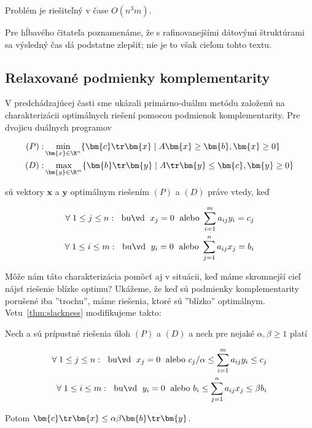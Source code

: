 \begin{veta}
  Problém \minfactor je riešiteľný v čase $O(n^3m)$.
\end{veta}

\noindent
Pre hĺbavého čitateľa poznamenáme, že s rafinovanejšími dátovými štruktúrami sa výsledný čas dá podstatne zlepšiť;
nie je to však cieľom tohto textu.



\subsection*{Relaxované podmienky komplementarity}


\noindent
V predchádzajúcej časti sme ukázali primárno-duálnu metódu založenú na charakterizácii
optimálnych riešení pomocou podmienok komplementarity. Pre dvojicu duálnych programov

\begin{eqnarray*}
  (P):&\min\limits_{\bm{x}\in\R^n}\{\bm{c}\tr\bm{x}\mid A\bm{x}\ge\bm{b}, \bm{x}\ge 0\}\\
  (D):&\max\limits_{\bm{y}\in\R^m}\{\bm{b}\tr\bm{y}\mid A\tr\bm{y}\le\bm{c}, \bm{y}\ge 0\}
\end{eqnarray*}

\noindent
sú vektory $\bm{x}$ a $\bm{y}$ optimálnym riešením $(P)$ a $(D)$ práve vtedy, keď

\begin{eqnarray*}
  \forall\;1\le j\le n:\;{\rm\ buď\ }\; x_j=0\; {\rm\ alebo\ }\sum_{i=1}^ma_{ij}y_i=c_j\\
  \forall\;1\le i\le m:\;{\rm\ buď\ }\; y_i=0\; {\rm\ alebo\ }\sum_{j=1}^na_{ij}x_j=b_i
\end{eqnarray*}

\noindent
Môže nám táto charakterizácia pomôcť aj v situácii, keď máme skromnejší cieľ nájsť riešenie
blízke optimu? Ukážeme, že keď sú podmienky komplementarity porušené iba ''trochu'',
máme riešenia, ktoré sú ''blízko'' optimálnym. Vetu~\ref{thm:slackness} modifikujeme takto:

\begin{framed}
\begin{veta}
  \label{thm:slacknessrelax}
   Nech  a  sú prípustné riešenia úloh $(P)$ a $(D)$ a nech pre nejaké 
   $\alpha,\beta\ge1$ platí

\begin{eqnarray*}
  \forall\;1\le j\le n:\;{\rm\ buď\ }\; x_j=0\; {\rm\ alebo\ }c_j/\alpha\le\sum_{i=1}^ma_{ij}y_i\le c_j\\
  \forall\;1\le i\le m:\;{\rm\ buď\ }\; y_i=0\; {\rm\ alebo\ }b_i\le\sum_{j=1}^na_{ij}x_j\le\beta b_i
\end{eqnarray*}

\noindent
Potom $\bm{c}\tr\bm{x}\le\alpha\beta\bm{b}\tr\bm{y}$.
\end{veta}
\end{framed}

